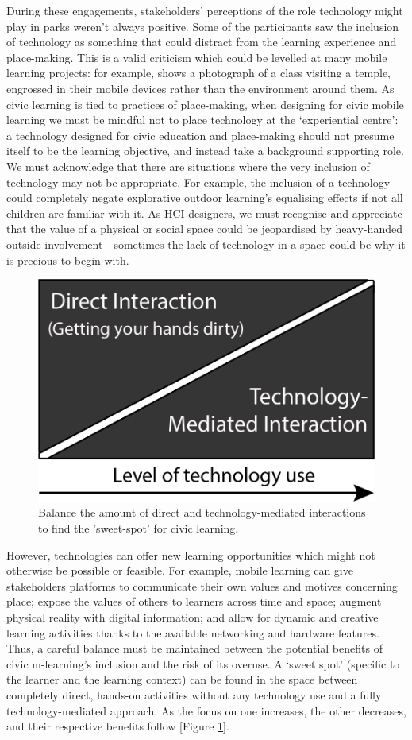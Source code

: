 During these engagements, stakeholders’ perceptions of the role technology might play in parks weren't always positive. Some of the participants saw the inclusion of technology as something that could distract from the learning experience and place-making. This is a valid criticism which could be levelled at many mobile learning projects: for example, \citep{Shih2010} shows a photograph of a class visiting a temple, engrossed in their mobile devices rather than the environment around them. As civic learning is tied to practices of place-making, when designing for civic mobile learning we must be mindful not to place technology at the `experiential centre': a technology designed for civic education and place-making should not presume itself to be the learning objective, and instead take a background supporting role. We must acknowledge that there are situations where the very inclusion of technology may not be appropriate. For example, the inclusion of a technology could completely negate explorative outdoor learning’s equalising effects if not all children are familiar with it. As HCI designers, we must recognise and appreciate that the value of a physical or social space could be jeopardised by heavy-handed outside involvement—sometimes the lack of technology in a space could be why it is precious to begin with.

\begin{figure}
  \centering
  \includegraphics[width=0.45\columnwidth]{images/chapter04/techBalance.png}
  \caption[Balancing technology use]{Balance the amount of direct and technology-mediated interactions to find the 'sweet-spot' for civic learning.}
  \label{fig:techBalance}
\end{figure}

However, technologies can offer new learning opportunities which might not otherwise be possible or feasible. For example, mobile learning can give stakeholders platforms to communicate their own values and motives concerning place; expose the values of others to learners across time and space; augment physical reality with digital information; and allow for dynamic and creative learning activities thanks to the available networking and hardware features. Thus, a careful balance must be maintained between the potential benefits of civic m-learning’s inclusion and the risk of its overuse. A `sweet spot' (specific to the learner and the learning context) can be found in the space between completely direct, hands-on activities without any technology use and a fully technology-mediated approach. As the focus on one increases, the other decreases, and their respective benefits follow [Figure \ref{fig:techBalance}]. 

